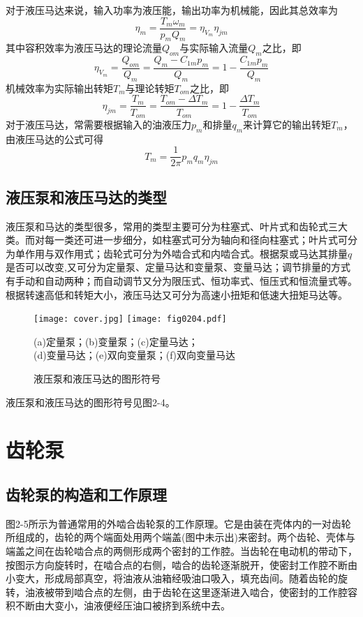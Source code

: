 对于液压马达来说，输入功率为液压能，输出功率为机械能，因此其总效率为
\begin{equation}
  \eta_{m}=\frac{T_{m}\omega_{m}}{p_{m}Q_{m}}=\eta_{V_{m}}\eta_{jm}
\end{equation}
其中容积效率为液压马达的理论流量$Q_{om}$与实际输入流量$Q_{m}$之比，即
\begin{equation}
  \eta_{V_{m}}=\frac{Q_{om}}{Q_{m}}=\frac{Q_{m}-C_{1m}p_{m}}{Q_{m}}=1-\frac{C_{1m}p_{m}}{Q_{m}}
\end{equation}
机械效率为实际输出转矩$T_{m}$与理论转矩$T_{om}$之比，即
\begin{equation}
  \eta_{jm}=\frac{T_{m}}{T_{om}}=\frac{T_{om}-{\Delta T_{m}}}{T_{om}}=1-\frac{\Delta T_{m}}{T_{om}}
\end{equation}
对于液压马达，常需要根据输入的油液压力$p_{m}$和排量$q_{m}$来计算它的输出转矩$T_{m}$，由液压马达的公式可得
\begin{equation}
  T_{m}=\frac{1}{2\pi}p_{m}q_{m}\eta_{jm}
\end{equation}

\subsection{液压泵和液压马达的类型}
液压泵和马达的类型很多，常用的类型主要可分为柱塞式、叶片式和齿轮式三大类。而对每一类还可进一步细分，如柱塞式可分为轴向和径向柱塞式；叶片式可分为单作用与双作用式；齿轮式可分为外啮合式和内啮合式。根据泵或马达其排量$q$是否可以改变,又可分为定量泵、定量马达和变量泵、变量马达；调节排量的方式有手动和自动两种；而自动调节又分为限压式、恒功率式、恒压式和恒流量式等。根据转速高低和转矩大小，液压马达又可分为高速小扭矩和低速大扭矩马达等。
\begin{figure}
\centering
\ifOpenSource
\texttt{[image: cover.jpg]}
\else
\texttt{[image: fig0204.pdf]}%
\fi
\caption{液压泵和液压马达的图形符号}
\centering\scriptsize(a)定量泵；(b)变量泵；(c)定量马达；\\\footnotesize(d)变量马达；(e)双向变量泵；(f)双向变量马达
\label{fig:fig0204}%
\end{figure}
液压泵和液压马达的图形符号见图2-4。




\section{齿轮泵}
\subsection{齿轮泵的构造和工作原理}
图2-5所示为普通常用的外啮合齿轮泵的工作原理。它是由装在壳体内的一对齿轮所组成的，齿轮的两个端面处用两个端盖(图中未示出)来密封。两个齿轮、壳体与端盖之间在齿轮啮合点的两侧形成两个密封的工作腔。当齿轮在电动机的带动下，按图示方向旋转时，在啮合点的右侧，啮合的齿轮逐渐脱开，使密封工作腔不断由小变大，形成局部真空，将油液从油箱经吸油口吸入，填充齿间。随着齿轮的旋转，油液被带到啮合点的左侧，由于齿轮在这里逐渐进入啮合，使密封的工作腔容积不断由大变小，油液便经压油口被挤到系统中去。

